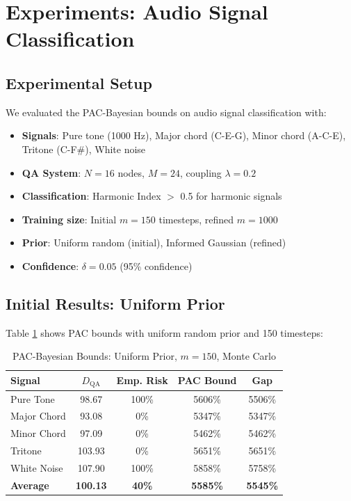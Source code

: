 \documentclass[11pt]{article}
\theoremstyle{remark}
\begin{document}
\section{Experiments: Audio Signal Classification}
\label{sec:experiments}

\subsection{Experimental Setup}

We evaluated the PAC-Bayesian bounds on audio signal classification with:

\begin{itemize}
    \item \textbf{Signals}: Pure tone (1000 Hz), Major chord (C-E-G), Minor chord (A-C-E), Tritone (C-F\#), White noise
    \item \textbf{QA System}: $N = 16$ nodes, $M = 24$, coupling $\lambda = 0.2$
    \item \textbf{Classification}: Harmonic Index $>$ 0.5 for harmonic signals
    \item \textbf{Training size}: Initial $m = 150$ timesteps, refined $m = 1000$
    \item \textbf{Prior}: Uniform random (initial), Informed Gaussian (refined)
    \item \textbf{Confidence}: $\delta = 0.05$ (95\% confidence)
\end{itemize}

\subsection{Initial Results: Uniform Prior}

Table \ref{tab:pac_initial} shows PAC bounds with uniform random prior and 150 timesteps:

\begin{table}[h]
\centering
\caption{PAC-Bayesian Bounds: Uniform Prior, $m=150$, Monte Carlo}
\label{tab:pac_initial}
\begin{tabular}{lcccc}
\toprule
\textbf{Signal} & \textbf{$D_{\text{QA}}$} & \textbf{Emp. Risk} & \textbf{PAC Bound} & \textbf{Gap} \\
\midrule
Pure Tone & 98.67 & 100\% & 5606\% & 5506\% \\
Major Chord & 93.08 & 0\% & 5347\% & 5347\% \\
Minor Chord & 97.09 & 0\% & 5462\% & 5462\% \\
Tritone & 103.93 & 0\% & 5651\% & 5651\% \\
White Noise & 107.90 & 100\% & 5858\% & 5758\% \\
\midrule
\textbf{Average} & \textbf{100.13} & \textbf{40\%} & \textbf{5585\%} & \textbf{5545\%} \\
\bottomrule
\end{tabular}
\end{table}
\end{document}
